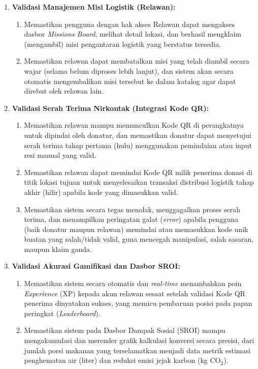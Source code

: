 \begin{enumerate}[label=\arabic*.]
    \item \textbf{Validasi Manajemen Misi Logistik (Relawan):}
    \begin{enumerate}[label=\alph*.]
        \item Memastikan pengguna dengan hak akses Relawan dapat mengakses dasbor \textit{Missions Board}, melihat detail lokasi, dan berhasil mengklaim (mengambil) misi pengantaran logistik yang berstatus tersedia.
        \item Memastikan relawan dapat membatalkan misi yang telah diambil secara wajar (selama belum diproses lebih lanjut), dan sistem akan secara otomatis mengembalikan misi tersebut ke dalam katalog agar dapat direbut oleh relawan lain.
    \end{enumerate}

    \item \textbf{Validasi Serah Terima Nirkontak (Integrasi Kode QR):}
    \begin{enumerate}[label=\alph*.]
        \item Memastikan relawan mampu memunculkan Kode QR di perangkatnya untuk dipindai oleh donatur, dan memastikan donatur dapat menyetujui serah terima tahap pertama (hulu) menggunakan pemindaian atau input resi manual yang valid.
        \item Memastikan relawan dapat memindai Kode QR milik penerima donasi di titik lokasi tujuan untuk menyelesaikan transaksi distribusi logistik tahap akhir (hilir) apabila kode yang dimasukkan valid.
        \item Memastikan sistem secara tegas menolak, menggagalkan proses serah terima, dan menampilkan peringatan galat (\textit{error}) apabila pengguna (baik donatur maupun relawan) memindai atau memasukkan kode unik buatan yang salah/tidak valid, guna mencegah manipulasi, salah sasaran, maupun klaim ganda.
    \end{enumerate}

    \item \textbf{Validasi Akurasi Gamifikasi dan Dasbor SROI:}
    \begin{enumerate}[label=\alph*.]
        \item Memastikan sistem secara otomatis dan \textit{real-time} menambahkan poin \textit{Experience} (XP) kepada akun relawan sesaat setelah validasi Kode QR penerima dinyatakan sukses, yang memicu pembaruan posisi pada papan peringkat (\textit{Leaderboard}).
        \item Memastikan sistem pada Dasbor Dampak Sosial (SROI) mampu mengakumulasi dan merender grafik kalkulasi konversi secara presisi, dari jumlah porsi makanan yang terselamatkan menjadi data metrik estimasi penghematan air (liter) dan reduksi emisi jejak karbon (kg CO$_2$).
    \end{enumerate}
\end{enumerate}


